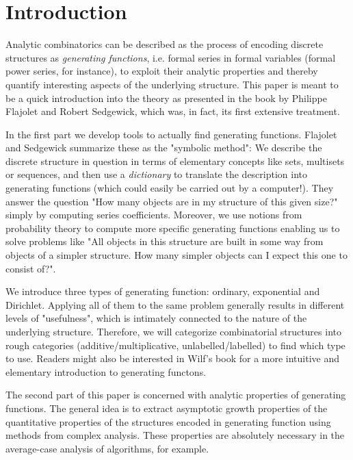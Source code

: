 \chapter*{Introduction}

Analytic combinatorics can be described as the process of encoding discrete structures as \textit{generating functions}, i.e. formal series in formal variables (formal power series, for instance), to exploit their analytic properties and thereby quantify interesting aspects of the underlying structure.
This paper is meant to be a quick introduction into the theory as presented in the book \cite{analyticcombinatorics} by Philippe Flajolet and Robert Sedgewick, which was, in fact, its first extensive treatment.

In the first part we develop tools to actually find generating functions.
Flajolet and Sedgewick summarize these as the "symbolic method":
We describe the discrete structure in question in terms of elementary concepts like sets, multisets or sequences, and then use a \textit{dictionary} to translate the description into generating functions (which could easily be carried out by a computer!).
They answer the question "How many objects are in my structure of this given size?" simply by computing series coefficients.
Moreover, we use notions from probability theory to compute more specific generating functions enabling us to solve problems like "All objects in this structure are built in some way from objects of a simpler structure. How many simpler objects can I expect this one to consist of?".

We introduce three types of generating function: ordinary, exponential and Dirichlet.
Applying all of them to the same problem generally results in different levels of "usefulness", which is intimately connected to the nature of the underlying structure.
Therefore, we will categorize combinatorial structures into rough categories (additive/multiplicative, unlabelled/labelled) to find which type to use.
Readers might also be interested in Wilf's book \cite{generatingfunctions} for a more intuitive and elementary introduction to generating functons.

The second part of this paper is concerned with analytic properties of generating functions. 
The general idea is to extract asymptotic growth properties of the quantitative properties of the structures encoded in generating function using methods from complex analysis.
These properties are absolutely necessary in the average-case analysis of algorithms, for example.

